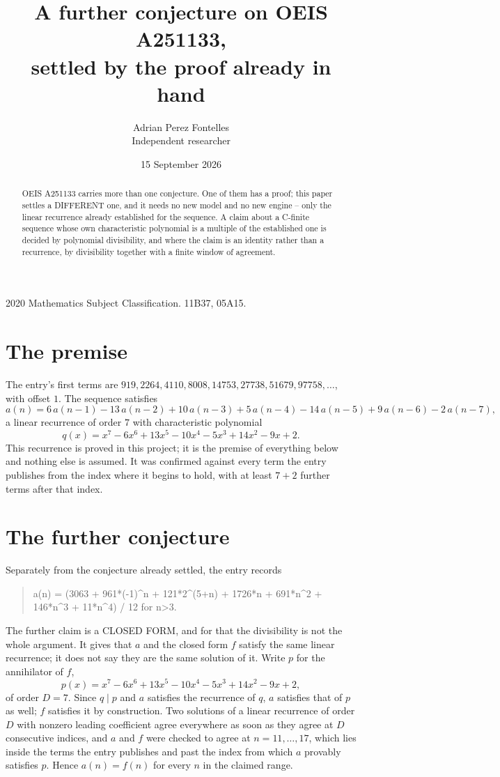 \documentclass[11pt,a4paper]{article}
\title{A further conjecture on OEIS A251133,\\ \large settled by the proof already in hand}
\author{Adrian Perez Fontelles\\ \small Independent researcher}
\date{15 September 2026}
\theoremstyle{plain}
\theoremstyle{definition}
\begin{document}
\maketitle

\begin{abstract}
OEIS A251133 carries more than one conjecture. One of them has a proof; this paper settles a
DIFFERENT one, and it needs no new model and no new engine -- only the linear recurrence already
established for the sequence. A claim about a C-finite sequence whose own characteristic
polynomial is a multiple of the established one is decided by polynomial divisibility, and where
the claim is an identity rather than a recurrence, by divisibility together with a finite window
of agreement.
\end{abstract}

\noindent\small 2020 Mathematics Subject Classification. 11B37, 05A15.\normalsize

\section{The premise}

The entry's first terms are $919, 2264, 4110, 8008, 14753, 27738, 51679, 97758,\dots$, with offset $1$. The sequence satisfies
\[
  a(n)=6\,a(n-1) - 13\,a(n-2) + 10\,a(n-3) + 5\,a(n-4) - 14\,a(n-5) + 9\,a(n-6) - 2\,a(n-7) ,
\]
a linear recurrence of order $7$ with characteristic polynomial
\[
  q(x)=x^{7} - 6 x^{6} + 13 x^{5} - 10 x^{4} - 5 x^{3} + 14 x^{2} - 9 x + 2 .
\]
This recurrence is proved in this project; it is the premise of everything below and nothing else is assumed.
It was confirmed against every term the entry publishes from the index where it begins to hold,
with at least $7+2$ further terms after that index.

\section{The further conjecture}

Separately from the conjecture already settled, the entry records

\begin{quote}\raggedright a(n) = (3063 + 961*(-1)\^{}n + 121*2\^{}(5+n) + 1726*n + 691*n\^{}2 + 146*n\^{}3 + 11*n\^{}4) / 12 for n>3.\end{quote}

The further claim is a CLOSED FORM, and for that the divisibility is not the whole argument. It
gives that $a$ and the closed form $f$ satisfy the same linear recurrence; it does not say they
are the same solution of it. Write $p$ for the annihilator of $f$,
\[
  p(x)=x^{7} - 6 x^{6} + 13 x^{5} - 10 x^{4} - 5 x^{3} + 14 x^{2} - 9 x + 2 ,
\]
of order $D=7$. Since $q\mid p$ and $a$ satisfies the recurrence of $q$, $a$ satisfies that of
$p$ as well; $f$ satisfies it by construction. Two solutions of a linear recurrence of order $D$
with nonzero leading coefficient agree everywhere as soon as they agree at $D$ consecutive
indices, and $a$ and $f$ were checked to agree at $n=11,\dots,17$,
which lies inside the terms the entry publishes and past the index from which $a$ provably
satisfies $p$. Hence $a(n)=f(n)$ for every $n$ in the claimed range.
\end{document}
